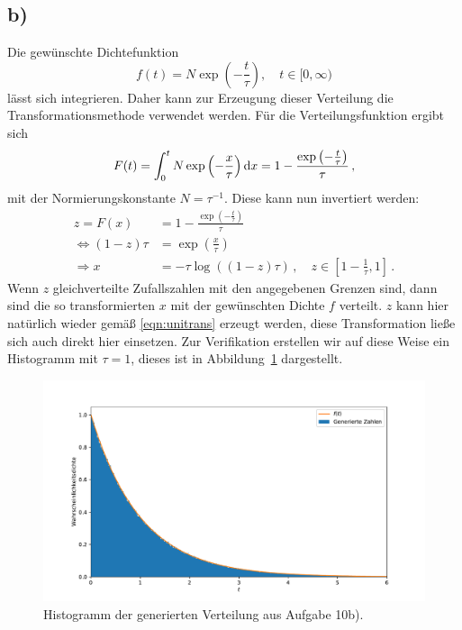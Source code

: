 \documentclass[a4paper, 11pt]{article}
\begin{document}
\subsection*{b)}
Die gewünschte Dichtefunktion 
\begin{equation}
    f(t) = N \exp\left(-\frac{t}{\tau}\right),\quad t \in [0, \infty)
\end{equation}
lässt sich integrieren. Daher kann zur Erzeugung dieser Verteilung die Transformationsmethode verwendet werden. Für die Verteilungsfunktion ergibt sich\begin{equation}
    F(t) = \int_{0}^{t} N \exp\left(-\frac{x}{\tau}\right) \textup{d}x = 1 - \frac{\exp\left(-\frac{t}{\tau}\right)}{\tau}\,,
\end{equation}
mit der Normierungskonstante $N = \tau^{-1}$. Diese kann nun invertiert werden:
\begin{align}
    z = F(x) &= 1 - \frac{\exp\left(-\frac{t}{\tau}\right)}{\tau} \\
    \Leftrightarrow (1 - z)\tau &= \exp\left(\frac{x}{\tau}\right) \\
    \Rightarrow x &= -\tau \log\left((1-z)\tau\right) \,, \quad z \in \left[1 - \frac{1}{\tau}, 1\right]\,.
\end{align}
Wenn $z$ gleichverteilte Zufallszahlen mit den angegebenen Grenzen sind, dann sind die so transformierten $x$ mit der gewünschten Dichte $f$ verteilt. $z$ kann hier natürlich wieder gemäß \eqref{eqn:unitrans} erzeugt werden, diese Transformation ließe sich auch direkt hier einsetzen. Zur Verifikation erstellen wir auf diese Weise ein Histogramm mit $\tau = 1$, dieses ist in Abbildung~\ref{fig:a10b} dargestellt. 
\begin{figure}
    \centering
    \includegraphics[width=\textwidth]{../A10/A10b.pdf}
    \caption{Histogramm der generierten Verteilung aus Aufgabe 10b).}
    \label{fig:a10b}
\end{figure}
\FloatBarrier
\end{document}
